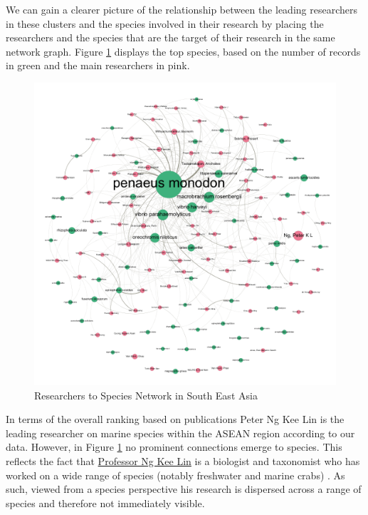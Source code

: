 \documentclass[openany]{book}
\theoremstyle{definition}
\theoremstyle{definition}
\theoremstyle{definition}
\theoremstyle{remark}
\begin{document}
We can gain a clearer picture of the relationship between the leading
researchers in these clusters and the species involved in their research
by placing the researchers and the species that are the target of their
research in the same network graph. Figure
\ref{fig:speciesresearchernetwork} displays the top species, based on
the number of records in green and the main researchers in pink.

\begin{figure}

{\centering \includegraphics[width=1\linewidth]{images/asean_authors_species_directed} 

}

\caption{Researchers to Species Network in South East Asia}\label{fig:speciesresearchernetwork}
\end{figure}

In terms of the overall ranking based on publications Peter Ng Kee Lin
is the leading researcher on marine species within the ASEAN region
according to our data. However, in Figure
\ref{fig:speciesresearchernetwork} no prominent connections emerge to
species. This reflects the fact that
\href{https://lkcnhm.nus.edu.sg/dna/people/details/17}{Professor Ng Kee
Lin} is a biologist and taxonomist who has worked on a wide range of
species (notably freshwater and marine crabs)
\citep{Cai_2002, Shih_2007}. As such, viewed from a species perspective
his research is dispersed across a range of species and therefore not
immediately visible.
\end{document}
